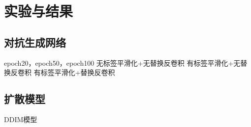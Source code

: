 \chapter{实验与结果}
\label{cha:experiment}

\section{对抗生成网络}

epoch20，epoch50，epoch100
无标签平滑化+无替换反卷积
有标签平滑化+无替换反卷积
有标签平滑化+替换反卷积

\section{扩散模型}
DDIM模型